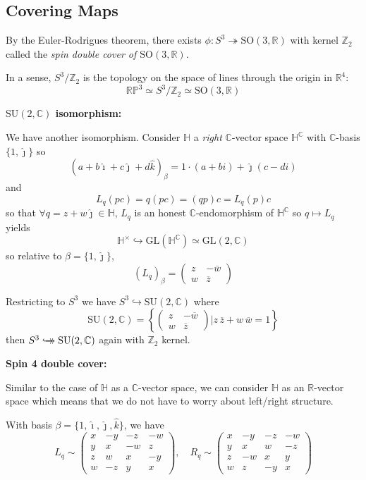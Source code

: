 \documentclass[12pt]{article}
\renewcommand{\hat}[1]{\widehat{#1}}
\newcommand{\R}{\mathbb{R}}
\newcommand{\Z}{\mathbb{Z}}
\newcommand{\C}{\mathbb{C}}
\renewcommand{\H}{\mathbb{H}}
\newcommand{\RP}{\mathbb{RP}}
\newcommand{\SO}{\text{SO}}
\newcommand{\GL}{\text{GL}}
\newcommand{\SU}{\text{SU}}
\newcommand{\biject}{\hookrightarrow \hspace{-8pt} \rightarrow}
\renewcommand{\bar}[1]{\overline{#1}}
\newcommand{\ihat}{\hat{\imath}}
\newcommand{\jhat}{\hat{\jmath}}
\newcommand{\khat}{\hat{k}}
\begin{document}
\subsection*{Covering Maps}
By the Euler-Rodrigues theorem, there exists $\phi: S^3 \twoheadrightarrow \SO(3, \R)$ with kernel $\Z_2$ called the \emph{spin double cover of $\SO(3, \R)$}. 

In a sense, $S^3/\Z_2$ is the topology on the space of lines through the origin in $\R^4$:
\[\RP^{3} \simeq S^3/\Z_2 \simeq \SO(3, \R)\]

\textbf{$\SU(2, \C)$ isomorphism:}

We have another isomorphism. Consider $\H$ a \emph{right} $\C$-vector space $\H^{\C}$ with $\C$-basis $\{1, \jhat\}$ so 
\[(a + b\ihat + c\jhat + d\khat)_{\beta} = 1 \cdot (a + bi) + \jhat(c - di)\]
and 
\[L_q(pc) = q(pc) = (qp)c = L_q(p)c\]
so that $\forall q = z + w\jhat \in \H$, $L_q$ is an honest $\C$-endomorphism of $\H^{\C}$ so $q \mapsto L_q$ yields 
\[\H^{\times} \hookrightarrow \GL(\H^{\C}) \simeq \GL(2, \C)\] 
so relative to $\beta = \{1, \jhat\}$, 
\[(L_q)_{\beta} = \begin{pmatrix}
    z & -\bar w\\
    w & \bar z
\end{pmatrix}\] 

Restricting to $S^3$ we have $S^3 \hookrightarrow \SU(2, \C)$ where 
\[\SU(2, \C) = \left\{\begin{pmatrix}
    z & -\bar w\\
    w & \bar z
\end{pmatrix} \bigg\vert z\, \bar z + w\, \bar w = 1\right\}\]
then $S^3 \biject \SU(2, \C)$ again with $\Z_2$ kernel. 

\textbf{Spin 4 double cover:} 

Similar to the case of $\H$ as a $\C$-vector space, we can consider $\H$ as an $\R$-vector space which means that we do not have to worry about left/right structure. 

With basis $\beta = \{1, \ihat, \jhat, \khat\}$, we have
\[L_q \sim \begin{pmatrix}
    x & -y & -z & -w\\
    y & x & -w & z\\
    z & w & x & -y\\
    w & -z & y & x
\end{pmatrix}, \quad R_q \sim \begin{pmatrix}
    x & -y & -z & -w\\
    y & x & w & -z\\
    z & -w & x & y\\
    w & z & -y & x
\end{pmatrix}\]
\end{document}
